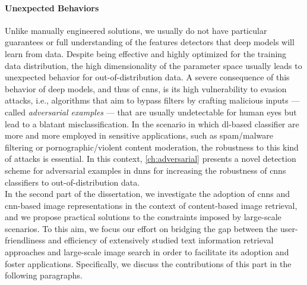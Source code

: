 \paragraph{Unexpected Behaviors}
Unlike manually engineered solutions, we usually do not have particular guarantees or full understanding of the features detectors that deep models will learn from data.
Despite being effective and highly optimized for the training data distribution, the high dimensionality of the parameter space usually leads to unexpected behavior for out-of-distribution data.
A severe consequence of this behavior of deep models, and thus of \glspl{cnn}, is its high vulnerability to evasion attacks, i.e., algorithms that aim to bypass filters by crafting malicious inputs --- called \emph{adversarial examples} --- that are usually undetectable for human eyes but lead to a blatant misclassification.
In the scenario in which \gls{dl}-based classifier are more and more employed in sensitive applications, such as spam/malware filtering or pornographic/violent content moderation, the robustness to this kind of attacks is essential.
In this context, \ref{ch:adversarial} presents a novel detection scheme for adversarial examples in \glspl{dnn} for increasing the robustness of \glspl{cnn} classifiers to out-of-distribution data.\\

In the second part of the dissertation, we investigate the adoption of \glspl{cnn} and \gls{cnn}-based image representations in the context of content-based image retrieval, and we propose practical solutions to the constraints imposed by large-scale scenarios.
To this aim, we focus our effort on bridging the gap between the user-friendliness and efficiency of extensively studied text information retrieval approaches and large-scale image search in order to facilitate its adoption and foster applications.
Specifically, we discuss the contributions of this part in the following paragraphs.

